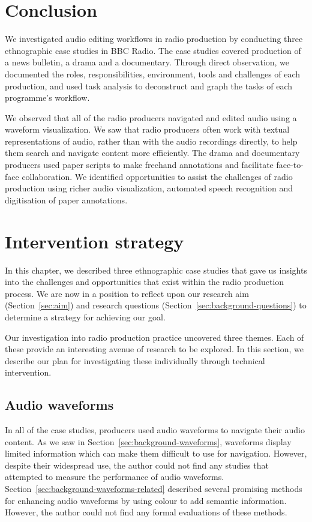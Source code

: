 \section{Conclusion}\label{sec:ethno-conclusion}
We investigated audio editing workflows in radio production by conducting three ethnographic case studies in BBC
Radio. The case studies covered production of a news bulletin, a drama and a documentary.  Through direct observation,
we documented the roles, responsibilities, environment, tools and challenges of each production, and used task analysis
to deconstruct and graph the tasks of each programme's workflow.

We observed that all of the radio producers navigated and edited audio using a waveform visualization. We saw that
radio producers often work with textual representations of audio, rather than with the audio recordings directly, to
help them search and navigate content more efficiently.  The drama and documentary producers used paper scripts to make
freehand annotations and facilitate face-to-face collaboration.  We identified opportunities to assist the challenges
of radio production using richer audio visualization, automated speech recognition and digitisation of paper
annotations.

\clearpage
\section{Intervention strategy}\label{sec:ethno-strategy}

In this chapter, we described three ethnographic case studies that gave us insights into the challenges and
opportunities that exist within the radio production process.  We are now in a position to reflect upon our research
aim (Section~\ref{sec:aim}) and research questions (Section~\ref{sec:background-questions}) to determine a strategy for
achieving our goal.

Our investigation into radio production practice uncovered three themes. Each of these provide an interesting avenue
of research to be explored. In this section, we describe our plan for investigating these individually through
technical intervention.

\subsection{Audio waveforms}

In all of the case studies, producers used audio waveforms to navigate their audio content.  As we saw in
Section~\ref{sec:background-waveforms}, waveforms display limited information which can make them difficult to use for
navigation.  However, despite their widespread use, the author could not find any studies that attempted to measure the
performance of audio waveforms.  Section~\ref{sec:background-waveforms-related} described several promising methods for
enhancing audio waveforms by using colour to add semantic information. However, the author could not find any formal
evaluations of these methods.

